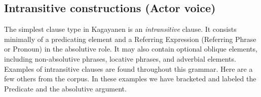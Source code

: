 \subsection{Intransitive constructions (Actor voice)}
\largerpage
\label{sec:Actorvoice}\label{sec:actorvoice}
The simplest clause type in Kagayanen is an \textit{intransitive} clause. It consists minimally of a predicating element and a Referring Expression (Referring Phrase or Pronoun) in the absolutive role. It may also contain optional oblique elements, including non-absolutive phrases, locative phrases, and adverbial elements. Examples of intransitive clauses are found throughout this grammar. Here are a few others from the corpus. In these examples we have bracketed and labeled the Predicate and the absolutive argument.

